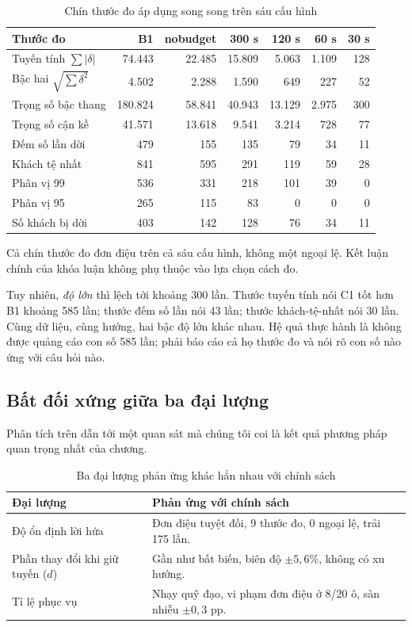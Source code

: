\begin{table}[htbp]
\centering
\caption{Chín thước đo áp dụng song song trên sáu cấu hình}
\label{bang:chinthuoc}
\footnotesize
\begin{tabular}{@{}lrrrrrr@{}}
\toprule
\textbf{Thước đo} & \textbf{B1} & \textbf{nobudget} & \textbf{300 s} & \textbf{120 s} & \textbf{60 s} & \textbf{30 s}\\
\midrule
Tuyến tính $\sum|\delta|$ & 74.443 & 22.485 & 15.809 & 5.063 & 1.109 & 128\\
Bậc hai $\sqrt{\sum \delta^2}$ & 4.502 & 2.288 & 1.590 & 649 & 227 & 52\\
Trọng số bậc thang & 180.824 & 58.841 & 40.943 & 13.129 & 2.975 & 300\\
Trọng số cận kề & 41.571 & 13.618 & 9.541 & 3.214 & 728 & 77\\
Đếm số lần dời & 479 & 155 & 135 & 79 & 34 & 11\\
Khách tệ nhất & 841 & 595 & 291 & 119 & 59 & 28\\
Phân vị 99 & 536 & 331 & 218 & 101 & 39 & 0\\
Phân vị 95 & 265 & 115 & 83 & 0 & 0 & 0\\
Số khách bị dời & 403 & 142 & 128 & 76 & 34 & 11\\
\bottomrule
\end{tabular}
\end{table}

Cả chín thước đo đơn điệu trên cả sáu cấu hình, không một ngoại lệ. Kết luận chính của khóa luận
không phụ thuộc vào lựa chọn cách đo.

Tuy nhiên, \emph{độ lớn} thì lệch tới khoảng 300 lần. Thước tuyến tính nói C1 tốt hơn B1 khoảng
585 lần; thước đếm số lần nói 43 lần; thước khách-tệ-nhất nói 30 lần. Cùng dữ liệu, cùng hướng,
hai bậc độ lớn khác nhau. Hệ quả thực hành là không được quảng cáo con số 585 lần; phải báo cáo
cả họ thước đo và nói rõ con số nào ứng với câu hỏi nào.

\subsection{Bất đối xứng giữa ba đại lượng}

Phân tích trên dẫn tới một quan sát mà chúng tôi coi là kết quả phương pháp quan trọng nhất của
chương.

\begin{table}[htbp]
\centering
\caption{Ba đại lượng phản ứng khác hẳn nhau với chính sách}
\label{bang:batdoixung}
\small
\begin{tabular}{@{}lp{9.4cm}@{}}
\toprule
\textbf{Đại lượng} & \textbf{Phản ứng với chính sách}\\
\midrule
Độ ổn định lời hứa & Đơn điệu tuyệt đối, 9 thước đo, 0 ngoại lệ, trải 175 lần.\\
Phần thay đổi khi giữ tuyến ($d$) & Gần như bất biến, biên độ $\pm 5{,}6\%$, không có xu hướng.\\
Tỉ lệ phục vụ & Nhạy quỹ đạo, vi phạm đơn điệu ở 8/20 ô, sàn nhiễu $\pm 0{,}3$ pp.\\
\bottomrule
\end{tabular}
\end{table}

